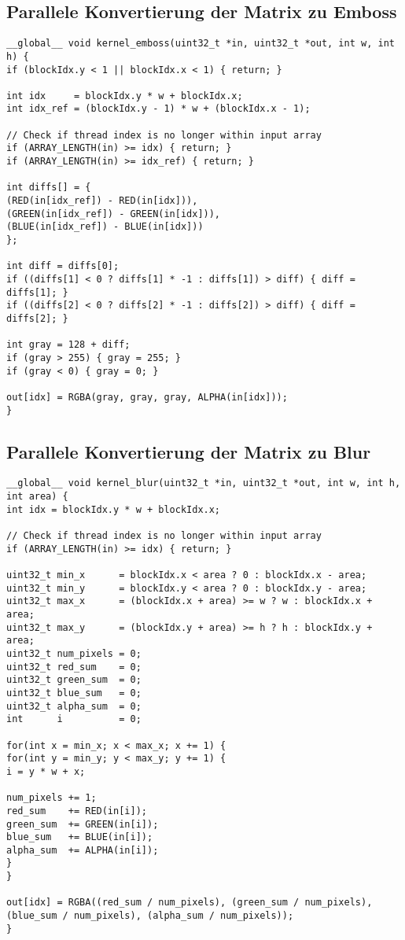 \documentclass{llncs}
\begin{document}
\subsection{Parallele Konvertierung der Matrix zu Emboss}
%
\begin{lstlisting}
__global__ void kernel_emboss(uint32_t *in, uint32_t *out, int w, int h) {
if (blockIdx.y < 1 || blockIdx.x < 1) { return; }

int idx     = blockIdx.y * w + blockIdx.x;
int idx_ref = (blockIdx.y - 1) * w + (blockIdx.x - 1);

// Check if thread index is no longer within input array
if (ARRAY_LENGTH(in) >= idx) { return; }
if (ARRAY_LENGTH(in) >= idx_ref) { return; }

int diffs[] = {
(RED(in[idx_ref]) - RED(in[idx])),
(GREEN(in[idx_ref]) - GREEN(in[idx])),
(BLUE(in[idx_ref]) - BLUE(in[idx]))
};

int diff = diffs[0];
if ((diffs[1] < 0 ? diffs[1] * -1 : diffs[1]) > diff) { diff = diffs[1]; }
if ((diffs[2] < 0 ? diffs[2] * -1 : diffs[2]) > diff) { diff = diffs[2]; }

int gray = 128 + diff;
if (gray > 255) { gray = 255; }
if (gray < 0) { gray = 0; }

out[idx] = RGBA(gray, gray, gray, ALPHA(in[idx]));
}
\end{lstlisting}
%
\subsection{Parallele Konvertierung der Matrix zu Blur}
%
\begin{lstlisting}
__global__ void kernel_blur(uint32_t *in, uint32_t *out, int w, int h, int area) {
int idx = blockIdx.y * w + blockIdx.x;

// Check if thread index is no longer within input array
if (ARRAY_LENGTH(in) >= idx) { return; }

uint32_t min_x      = blockIdx.x < area ? 0 : blockIdx.x - area;
uint32_t min_y      = blockIdx.y < area ? 0 : blockIdx.y - area;
uint32_t max_x      = (blockIdx.x + area) >= w ? w : blockIdx.x + area;
uint32_t max_y      = (blockIdx.y + area) >= h ? h : blockIdx.y + area;
uint32_t num_pixels = 0;
uint32_t red_sum    = 0;
uint32_t green_sum  = 0;
uint32_t blue_sum   = 0;
uint32_t alpha_sum  = 0;
int      i          = 0;

for(int x = min_x; x < max_x; x += 1) {
for(int y = min_y; y < max_y; y += 1) {
i = y * w + x;

num_pixels += 1;
red_sum    += RED(in[i]);
green_sum  += GREEN(in[i]);
blue_sum   += BLUE(in[i]);
alpha_sum  += ALPHA(in[i]);
}
}

out[idx] = RGBA((red_sum / num_pixels), (green_sum / num_pixels), (blue_sum / num_pixels), (alpha_sum / num_pixels));
}
\end{lstlisting}
%
\end{document}

